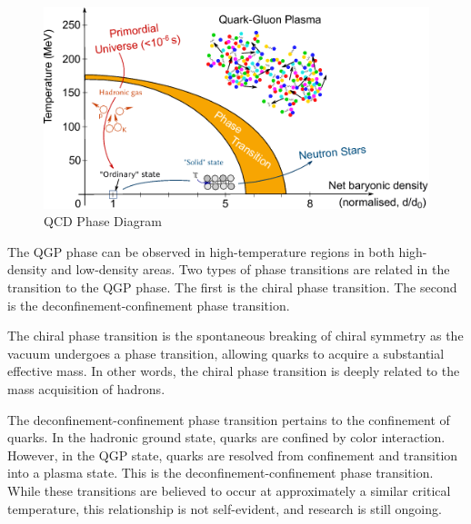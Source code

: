         \begin{figure}[hbtp]
            \centering
            \includegraphics[keepaspectratio, scale=0.6]{fig/1_4_QCDPhaseDiagram.png}
            \caption{QCD Phase Diagram\cite{QCDPhaseDiagram}}
            \label{QCD_Phase_Diagram}
        \end{figure}
        The QGP phase can be observed in high-temperature regions in both high-density and low-density areas. Two types of phase transitions are related in the transition to the QGP phase. The first is the chiral phase transition. The second is the deconfinement-confinement phase transition.  
        
        The chiral phase transition is the spontaneous breaking of chiral symmetry as the vacuum undergoes a phase transition, allowing quarks to acquire a substantial effective mass. In other words, the chiral phase transition is deeply related to the mass acquisition of hadrons.  
               
        The deconfinement-confinement phase transition pertains to the confinement of quarks. In the hadronic ground state, quarks are confined by color interaction. However, in the QGP state, quarks are resolved from confinement and transition into a plasma state. This is the deconfinement-confinement phase transition. While these transitions are believed to occur at approximately a similar critical temperature, this relationship is not self-evident, and research is still ongoing. 
        
